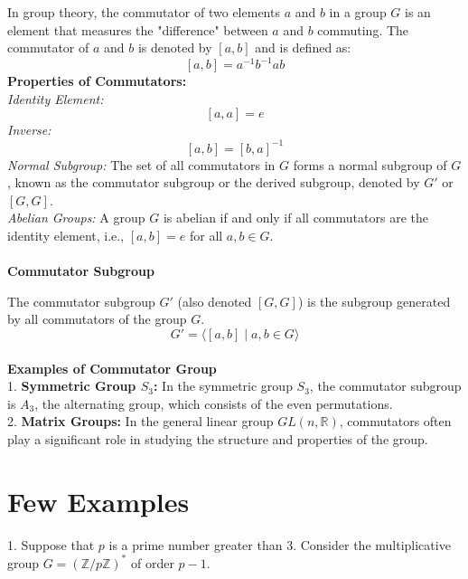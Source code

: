 In group theory, the commutator of two elements \(a\) and \(b\) in a group \(G\) is an element that measures the "difference" between \(a\) and \(b\) commuting. The commutator of \(a\) and \(b\) is denoted by \([a, b]\) and is defined as:
\[ [a, b] = a^{-1}b^{-1}ab \]
\textbf{Properties of Commutators:}\\
\textit{Identity Element:}
   \[
   [a, a] = e
   \]
 \textit{Inverse:}
   \[
   [a, b] = [b, a]^{-1}
   \]
\textit{Normal Subgroup:}
   The set of all commutators in \(G\) forms a normal subgroup of \(G\), known as the commutator subgroup or the derived subgroup, denoted by \(G'\) or \([G, G]\).
\\
\textit{Abelian Groups:}
   A group \(G\) is abelian if and only if all commutators are the identity element, i.e., \([a, b] = e\) for all \(a, b \in G\).
\\\\
\textbf{Commutator Subgroup}

The commutator subgroup \(G'\) (also denoted \([G, G]\)) is the subgroup generated by all commutators of the group \(G\).
\[ G' = \langle [a, b] \mid a, b \in G \rangle \]
\\
\textbf{Examples of Commutator Group}
\\
1. \textbf{Symmetric Group \(S_3\):}
   In the symmetric group \(S_3\), the commutator subgroup is \(A_3\), the alternating group, which consists of the even permutations.
\\
2. \textbf{Matrix Groups:}
   In the general linear group \(GL(n, \mathbb{R})\), commutators often play a significant role in studying the structure and properties of the group.

\section{Few Examples}
1. Suppose that \( p \) is a prime number greater than 3. Consider the multiplicative group \( G = (\mathbb{Z}/p\mathbb{Z})^* \) of order \( p-1 \).

